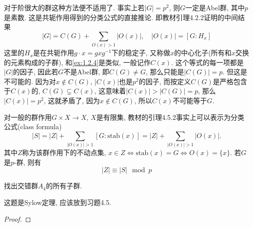 \begin{remark}
    对于阶很大的群这种方法便不适用了. 事实上若$|G| = p^2$, 则$G$一定是Abel群, 其中$p$是素数. 这是共轭作用得到的分类公式的直接推论. 即教材引理4.2.2证明的中间结果
    \[
        |G| = C(G) + \sum_{O(x) > 1} |O(x)|,\quad |O(x)| = [G:H_x]
    \]
    这里的$H_x$是在共轭作用$g \cdot x = gxg^{-1}$下的稳定子, 又称做$x$的中心化子(所有和$x$交换的元素构成的子群), 和\ref{ex:1.2.4}是类似, 一般记作$C(x)$. 这个等式的每一项都是$|G|$的因子, 因此若$G$不是Abel群, 即$C(G) \neq G$, 那么只能是$|C(G)| = p$. 但这是不可能的. 因为对$x \notin C(G)$, $|C(x)|$也是$p^2$的因子, 而按定义$C(G)$是严格包含于$C(x)$的, $C(G) \subsetneq C(x)$, 这意味着$|C(x)| > |C(G)| = p$, 那么$|C(x)| = p^2$, 这就矛盾了, 因为$x \notin C(G)$, 所以$C(x)$不可能等于$G$.

    对一般的群作用$G \times X \to X$, $X$是有限集, 教材的引理4.5.2事实上可以表示为分类公式(class formula)
    \[
        |S| = |Z| + \sum_{|O(x)| > 1} [G:\mathrm{stab}(x)] = |Z| + \sum_{|O(x)| > 1} |O(x)|.
    \]
    其中$Z$称为该群作用下的不动点集, $x \in Z \iff \mathrm{stab}(x) = G \iff O(x) = \{x\}$. 若$G$是$p$-群, 则有
    \[
        |Z| \equiv |S| \mod p
    \]
\end{remark}

\begin{problem}
    找出交错群$A_4$的所有子群.
\end{problem}

\begin{remark}
    这题是Sylow定理, 应该放到习题4.5.
\end{remark}

\begin{proof}
    
\end{proof}